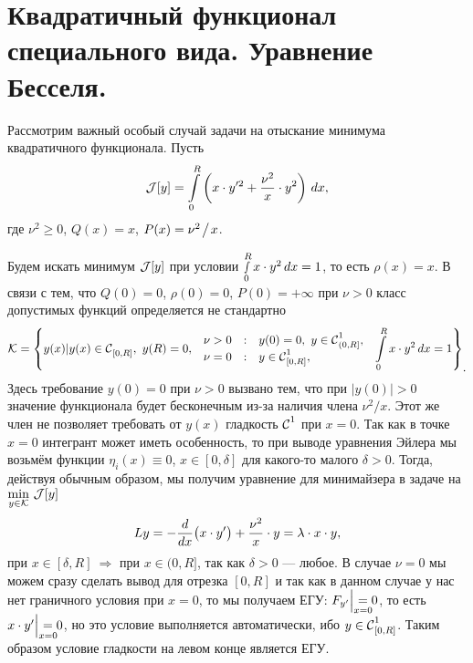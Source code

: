 


\section[Функционал Бесселя. Уравнение Бесселя.]{Квадратичный функционал специального вида. Уравнение Бесселя.}	
\label{lecture8section2}

Рассмотрим важный особый случай задачи на отыскание минимума квадратичного функционала. Пусть
\begin{equation*}
	\hfill\J[y]=\int\limits_0^R\left(x\cdot y^{\prime2}+\frac{\nu^2}{x}\cdot y^2\right)\,dx,\hfill
\end{equation*}
где $\nu^2\geqslant0$, $Q(x)=x$, $P(x)=\nu^2\!\bigm/\!x$.

Будем искать минимум $\J[y]$ при условии $\smallint\limits_0^R x\cdot y^2\,dx=1$, то есть $\rho(x)=x$. В связи с тем, что $Q(0)=0$, $\rho(0)=0$, $P(0)=+\infty$ при $\nu>0$ класс допустимых функций определяется не стандартно
\begin{equation*}
	\hfill\K=\left\{y(x)|y(x)\in\Cfn[{[0,R]}]{},\ y(R)=0,\ \begin{array}{rcl}
		\nu>0&:&y(0)=0,\ y\in\Cfn[{(0,R]}]{1},\\
		\nu=0&:&y\in\Cfn[{[0,R]}]{1},
	\end{array}\ \int\limits_0^R x\cdot y^2\,dx=1\right\}_{\displaystyle.}\hfill
\end{equation*} 
Здесь требование $y(0)=0$ при $\nu>0$ вызвано тем, что при $|y(0)|>0$ значение функционала будет бесконечным из-за наличия члена $\nu^2/x$. Этот же член не позволяет требовать от $y(x)$ гладкость $\Cfn[]{1}$ при $x=0$. Так как в точке $x=0$ интегрант может иметь особенность, то при выводе уравнения Эйлера мы возьмём функции $\eta_i(x)\equiv0$, $x\in[0,\delta]$ для какого-то малого $\delta>0$. Тогда, действуя обычным образом, мы получим уравнение для минимайзера в задаче на $\displaystyle\min\limits_{y\in\K}\,\J[y]$
\begin{equation*}
	\hfill Ly=-\der{}{x}\big(x\cdot y'\big)+\frac{\nu^2}{x}\cdot y=\lambda\cdot x\cdot y,\hfill
\end{equation*}
при $x\in[\delta,R]\ \Rightarrow$ при $x\in(0,R]$, так как $\delta>0$ --- любое. В случае $\nu=0$ мы можем сразу сделать вывод для отрезка $[0,R]$ и так как в данном случае у нас нет граничного условия при $x=0$, то мы получаем ЕГУ: $F_{y'}\Big|_{\lefteqn{\scriptstyle x=0}}=0$, то есть $x\cdot y'\Big|_{\lefteqn{\scriptstyle x=0}}=0$, но это условие выполняется автоматически, ибо $y\in\Cfn[{[0,R]}]{1}$. Таким образом условие гладкости на левом конце является ЕГУ.

